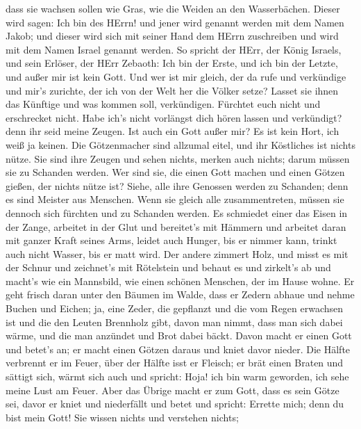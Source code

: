 dass sie wachsen sollen wie Gras, wie die Weiden an den
Wasserbächen.  Dieser wird sagen: Ich bin des HErrn! und
jener wird genannt werden mit dem Namen Jakob; und dieser wird sich mit
seiner Hand dem HErrn zuschreiben und wird mit dem Namen Israel genannt
werden.  So spricht der HErr, der König Israels, und sein
Erlöser, der HErr Zebaoth: Ich bin der Erste, und ich bin der Letzte,
und außer mir ist kein Gott.  Und wer ist mir gleich, der da
rufe und verkündige und mir's zurichte, der ich von der Welt her die
Völker setze? Lasset sie ihnen das Künftige und was kommen soll,
verkündigen.  Fürchtet euch nicht und erschrecket nicht.
Habe ich's nicht vorlängst dich hören lassen und verkündigt? denn ihr
seid meine Zeugen. Ist auch ein Gott außer mir? Es ist kein Hort, ich
weiß ja keinen.  Die Götzenmacher sind allzumal eitel, und
ihr Köstliches ist nichts nütze. Sie sind ihre Zeugen und sehen nichts,
merken auch nichts; darum müssen sie zu Schanden werden. 
Wer sind sie, die einen Gott machen und einen Götzen gießen, der nichts
nütze ist?  Siehe, alle ihre Genossen werden zu Schanden;
denn es sind Meister aus Menschen. Wenn sie gleich alle zusammentreten,
müssen sie dennoch sich fürchten und zu Schanden werden. 
Es schmiedet einer das Eisen in der Zange, arbeitet in der Glut und
bereitet's mit Hämmern und arbeitet daran mit ganzer Kraft seines Arms,
leidet auch Hunger, bis er nimmer kann, trinkt auch nicht Wasser, bis er
matt wird.  Der andere zimmert Holz, und misst es mit der
Schnur und zeichnet's mit Rötelstein und behaut es und zirkelt's ab und
macht's wie ein Mannsbild, wie einen schönen Menschen, der im Hause
wohne.  Er geht frisch daran unter den Bäumen im Walde,
dass er Zedern abhaue und nehme Buchen und Eichen; ja, eine Zeder, die
gepflanzt und die vom Regen erwachsen ist  und die den
Leuten Brennholz gibt, davon man nimmt, dass man sich dabei wärme, und
die man anzündet und Brot dabei bäckt. Davon macht er einen Gott und
betet's an; er macht einen Götzen daraus und kniet davor nieder.
 Die Hälfte verbrennt er im Feuer, über der Hälfte isst er
Fleisch; er brät einen Braten und sättigt sich, wärmt sich auch und
spricht: Hoja! ich bin warm geworden, ich sehe meine Lust am Feuer.
 Aber das Übrige macht er zum Gott, dass es sein Götze sei,
davor er kniet und niederfällt und betet und spricht: Errette mich; denn
du bist mein Gott!  Sie wissen nichts und verstehen nichts;
